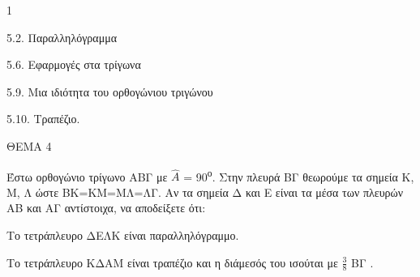\begin{ylh}{1}
    \item 5.2. Παραλληλόγραμμα
    \item 5.6. Εφαρμογές στα τρίγωνα
    \item 5.9. Μια ιδιότητα του ορθογώνιου τριγώνου
    \item 5.10. Τραπέζιο.
\end{ylh}

ΘΕΜΑ 4

Έστω ορθογώνιο τρίγωνο ΑΒΓ με $\widehat{Α}$ = 90\textsuperscript{ο}. Στην πλευρά ΒΓ θεωρούμε τα σημεία Κ, Μ, Λ ώστε ΒΚ=ΚΜ=ΜΛ=ΛΓ. Αν τα σημεία Δ και Ε είναι τα μέσα των πλευρών ΑΒ και ΑΓ αντίστοιχα, να αποδείξετε ότι:

\begin{alist}
\item Το τετράπλευρο ΔΕΛΚ είναι παραλληλόγραμμο. 

\item Το τετράπλευρο ΚΔΑΜ είναι τραπέζιο και η διάμεσός του ισούται με $\frac{3}{8}$ ΒΓ .



\begin{center}
\end{center}
\end{alist}
